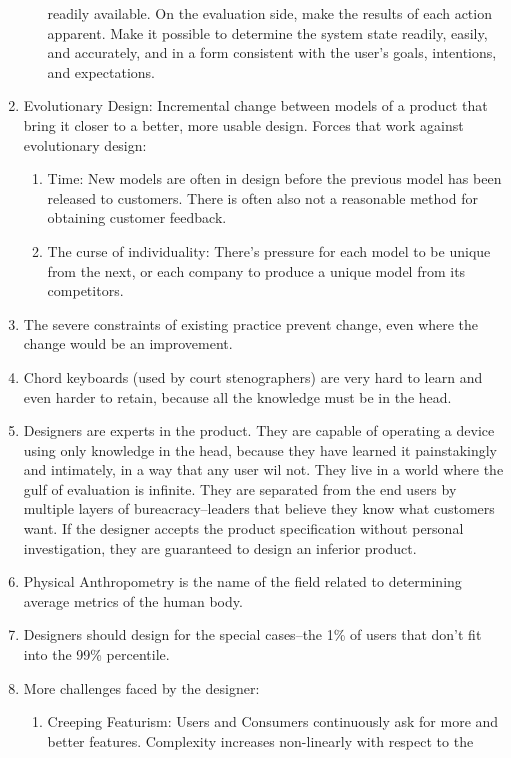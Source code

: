 \documentclass{designdoc}
\begin{document}
\begin{enumerate}
\begin{enumerate}
    readily available. On the evaluation side, make the results of each action
    apparent. Make it possible to determine the system state readily, easily,
    and accurately, and in a form consistent with the user's goals, intentions,
    and expectations.
  \end{enumerate}
\item Evolutionary Design: Incremental change between models of a product that
  bring it closer to a better, more usable design. Forces that work against
  evolutionary design:
  \begin{enumerate}
  \item Time: New models are often in design before the previous model has been
    released to customers. There is often also not a reasonable method for
    obtaining customer feedback.
  \item The curse of individuality: There's pressure for each model to be
    unique from the next, or each company to produce a unique model from its
    competitors.
  \end{enumerate}
\item The severe constraints of existing practice prevent change, even where
  the change would be an improvement.
\item Chord keyboards (used by court stenographers) are very hard to learn and
  even harder to retain, because all the knowledge must be in the head.
\item Designers are experts in the product. They are capable of operating a
  device using only knowledge in the head, because they have learned it
  painstakingly and intimately, in a way that any user wil not. They live in a
  world where the gulf of evaluation is infinite. They are separated from the
  end users by multiple layers of bureacracy--leaders that believe they know
  what customers want. If the designer accepts the product specification
  without personal investigation, they are guaranteed to design an inferior
  product.
\item Physical Anthropometry is the name of the field related to determining
  average metrics of the human body.
\item Designers should design for the special cases--the 1\% of users that
  don't fit into the 99\% percentile.
\item More challenges faced by the designer:
  \begin{enumerate}
  \item Creeping Featurism: Users and Consumers continuously ask for more and
    better features. Complexity increases non-linearly with respect to the

\end{enumerate}
\end{enumerate}
\end{document}
